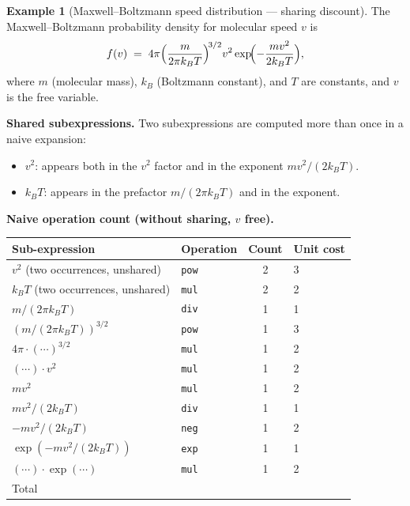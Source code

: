 \documentclass[12pt,a4paper]{article}
\theoremstyle{definition}
\newtheorem{example}[theorem]{Example}
\begin{document}
\begin{example}[Maxwell--Boltzmann speed distribution --- sharing discount]
\label{ex:maxwellboltzmann}
The Maxwell--Boltzmann probability density for molecular speed $v$ is
\[
  f(v) \;=\; 4\pi
  \Bigl(\frac{m}{2\pi k_B T}\Bigr)^{\!3/2}
  v^2 \exp\!\Bigl(-\frac{mv^2}{2k_BT}\Bigr),
\]
where $m$ (molecular mass), $k_B$ (Boltzmann constant), and $T$ are
constants, and $v$ is the free variable.

\smallskip
\noindent\textbf{Shared subexpressions.}
Two subexpressions are computed more than once in a naive expansion:
\begin{itemize}
  \item $v^2$: appears both in the $v^2$ factor and in the exponent $mv^2/(2k_BT)$.
  \item $k_B T$: appears in the prefactor $m/(2\pi k_B T)$ and in the exponent.
\end{itemize}

\smallskip
\noindent\textbf{Naive operation count (without sharing, $v$ free).}

\begin{center}
\begin{tabular}{@{}llcl@{}}
\toprule
Sub-expression & Operation & Count & Unit cost \\
\midrule
$v^2$ (two occurrences, unshared) & \texttt{pow} & 2 & 3 \\
$k_B T$ (two occurrences, unshared) & \texttt{mul} & 2 & 2 \\
$m / (2\pi k_B T)^{\phantom{x}}$ & \texttt{div} & 1 & 1 \\
$(m/(2\pi k_B T))^{3/2}$ & \texttt{pow} & 1 & 3 \\
$4\pi \cdot (\cdots)^{3/2}$ & \texttt{mul} & 1 & 2 \\
$(\cdots) \cdot v^2$ & \texttt{mul} & 1 & 2 \\
$m v^2$ & \texttt{mul} & 1 & 2 \\
$mv^2 / (2k_BT)$ & \texttt{div} & 1 & 1 \\
$-mv^2/(2k_BT)$ & \texttt{neg} & 1 & 2 \\
$\exp(-mv^2/(2k_BT))$ & \texttt{exp} & 1 & 1 \\
$(\cdots) \cdot \exp(\cdots)$ & \texttt{mul} & 1 & 2 \\
\midrule
Total & & & \\
\bottomrule
\end{tabular}
\end{center}


\end{example}
\end{document}
